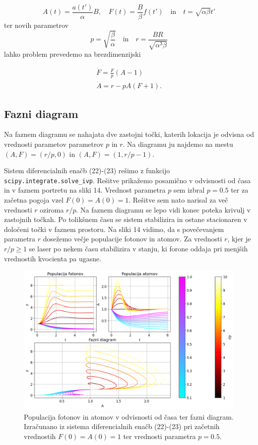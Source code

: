 \documentclass[slovene,11pt,a4paper]{article}
\begin{document}
\[
A(t) = \frac{a(t')}{\alpha} B, \quad F(t) = \frac{B}{\beta} f(t') \quad \text{in} \quad t = \sqrt{\alpha \beta} t'
\]
ter novih parametrov
\[
p = \sqrt{\frac{\beta}{\alpha}} \quad \text{in} \quad r = \frac{BR}{\sqrt{\alpha^3 \beta}}
\]
lahko problem prevedemo na brezdimenzijski

\begin{align}
\dot{F} = \frac{F}{p}(A-1) \\
\dot{A} = r - pA(F+1).
\end{align}

\subsection{Fazni diagram}

Na faznem diagramu se nahajata dve zastojni točki, katerih lokacija je odvisna od vrednosti parametov parametrov $p$ in $r$. Na diagramu ju najdemo na mestu $(A,F) = (r/p, 0)$ in $(A,F) = (1, r/p -1)$.

Sistem diferencialnih enačb (22)-(23) rešimo z funkcijo \texttt{scipy.integrate.solve\_ivp}. Rešitve prikažemo posamično v odvisnosti od časa in v faznem portretu na sliki 14. Vrednost parametra $p$ sem izbral $p=0.5$ ter za začetna pogoja vzel $F(0)=A(0)=1$. Rešitve sem nato narisal za več vrednosti $r$ oziroma $r/p$. Na faznem diagramu se lepo vidi konec poteka krivulj v zastojnih točkah. Po tolikšnem času se sistem stabilizira in ostane stacionaren v določeni točki v faznem prostoru. Na sliki 14 vidimo, da s povečevanjem parametra $r$ dosežemo večje populacije fotonov in atomov. Za vrednosti $r$, kjer je $r/p \geq 1$ se laser po nekem času stabilizira v stanju, ki forone oddaja pri menjših vrednostih kvocienta pa ugasne.

\begin{figure}[h!]
\centering
\includegraphics[width=15cm]{laser1.png}
\caption{Populacija fotonov in atomov v odvisnosti od časa ter fazni diagram. Izračunano iz sistema diferencialnih enačb (22)-(23) pri začetnih vrednostih $F(0)=A(0)=1$ ter vrednosti parametra $p=0.5$.}
\end{figure}
\end{document}
